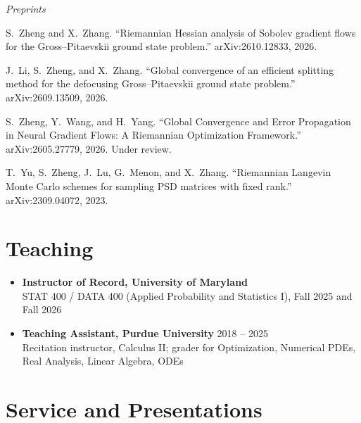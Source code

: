 \documentclass[11pt]{article}
\begin{document}
\textit{Preprints}
\begin{enumerate}[label={[\arabic*]}, leftmargin=1.5em, itemsep=3pt, resume]

\item S.\ Zheng and X.\ Zhang.
``Riemannian Hessian analysis of Sobolev gradient flows for the Gross--Pitaevskii ground state problem.''
arXiv:2610.12833, 2026.

\item J.\ Li, S.\ Zheng, and X.\ Zhang.
``Global convergence of an efficient splitting method for the defocusing Gross--Pitaevskii ground state problem.''
arXiv:2609.13509, 2026.

\item S.\ Zheng, Y.\ Wang, and H.\ Yang.
``Global Convergence and Error Propagation in Neural Gradient Flows: A Riemannian Optimization Framework.''
arXiv:2605.27779, 2026. Under review.

\item T.\ Yu, S.\ Zheng, J.\ Lu, G.\ Menon, and X.\ Zhang.
``Riemannian Langevin Monte Carlo schemes for sampling PSD matrices with fixed rank.''
arXiv:2309.04072, 2023.

\end{enumerate}

\section{Teaching}

\begin{itemize}[leftmargin=0pt, label={}, itemsep=4pt]
\item \textbf{Instructor of Record, University of Maryland}\\
STAT 400 / DATA 400 (Applied Probability and Statistics I), Fall 2025 and Fall 2026

\item \textbf{Teaching Assistant, Purdue University} \hfill 2018 -- 2025\\
Recitation instructor, Calculus II; grader for Optimization, Numerical PDEs, Real Analysis, Linear Algebra, ODEs
\end{itemize}

\section{Service and Presentations}
\end{document}
